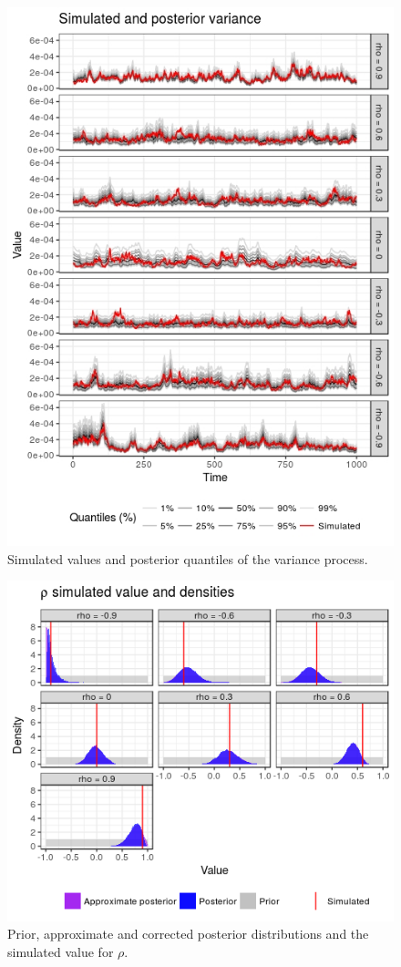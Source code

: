 \begin{figure}
	\centering
	\includegraphics[width=\linewidth]{simulations/variance-plot}
	\caption{Simulated values and posterior quantiles of the variance process.}
	\label{fig:volatility}
\end{figure}

\begin{figure}
	\centering
	\includegraphics[width=\linewidth]{simulations/rho-densities}
	\caption[Prior, approximate and corrected posterior and simulated $\rho$]{Prior, approximate and corrected posterior distributions and the simulated value for $\rho$.}
	\label{fig:rhodensities}
\end{figure}
